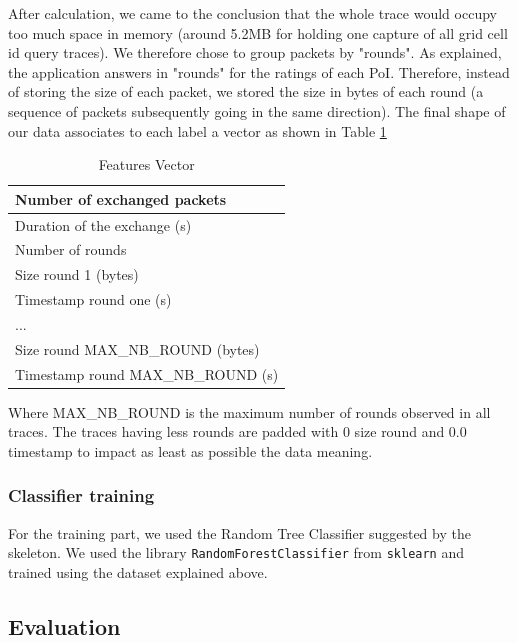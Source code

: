 \documentclass[10pt,conference,compsocconf]{IEEEtran}
\begin{document}
After calculation, we came to the conclusion that the whole trace would occupy too much space in memory (around 5.2MB for holding one capture of all grid cell id query traces). We therefore chose to group packets by "rounds". As explained, the application answers in "rounds" for the ratings of each PoI. Therefore, instead of storing the size of each packet, we stored the size in bytes of each round (a sequence of packets subsequently going in the same direction). The final shape of our data associates to each label a vector as shown in Table \ref{tab:feature_vec}
\begin{table}[h!]
\begin{center}
\begin{tabular}{l} 
 Number of exchanged packets \\
 \hline
 Duration of the exchange (s) \\
 \hline
 Number of rounds \\
 \hline
 Size round 1 (bytes) \\
\hline
 Timestamp round one (s) \\
 \hline
 ... \\
 \hline
 Size round MAX\_NB\_ROUND (bytes) \\
 \hline
 Timestamp round  MAX\_NB\_ROUND (s) \\
\end{tabular}
\end{center}
\caption{\label{tab:feature_vec}Features Vector}
\end{table}

Where MAX\_NB\_ROUND is the maximum number of rounds observed in all traces. The traces having less rounds are padded with 0 size round and 0.0 timestamp to impact as least as possible the data meaning.
\subsubsection{Classifier training}
For the training part, we used the Random Tree Classifier suggested by the skeleton. We used the library \texttt{RandomForestClassifier} from \texttt{sklearn} and trained using the dataset explained above.

\subsection{Evaluation}
\end{document}
